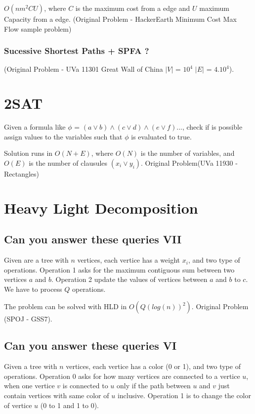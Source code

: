 \documentclass{report}
\begin{document}
            \bigskip
            
            $O(nm^2CU)$, where $C$ is the maximum cost from a edge and $U$ maximum Capacity from a edge. (Original Problem - HackerEarth Minimum Cost Max Flow sample problem)
    
            
            \subsubsection{Sucessive Shortest Paths + SPFA ?}
            
            (Original Problem - UVa 11301 Great Wall of China $|V|$ = $10^4$ $|E|$ = $4.10^4$).
            
            
    \section{2SAT}
    Given a formula like $\phi$ = $(a \lor b) \land (c \lor d) \land (e \lor f)...$, check if is possible assign values to the variables such that $\phi$ is evaluated to true.
    
    \bigskip
    
    Solution runs in $O(N + E)$, where $O(N)$ is the number of variables, and $O(E)$ is the number of clausules $(x_i \lor y_i)$. Original Problem(UVa 11930 - Rectangles)
    
    
    \section{Heavy Light Decomposition}
        \subsection{Can you answer these queries VII}
        Given are a tree with $n$ vertices, each vertice has a weight $x_i$, and two type of operations. Operation 1 asks for the maximum contiguous sum between two vertices $a$ and $b$. Operation 2 update the values of vertices between $a$ and $b$ to $c$. We have to process $Q$ operations.
        
        The problem can be solved with HLD in $O(Q(log(n))^2)$. Original Problem (SPOJ - GSS7).
        
        
        
        \subsection{Can you answer these queries VI}
        Given a tree with $n$ vertices, each vertice has a color (0 or 1), and two type of operations. Operation 0 asks for how many vertices are connected to a vertice $u$, when one vertice $v$ is connected to $u$ only if the path between $u$ and $v$ just contain vertices with same color of $u$ inclusive. Operation 1 is to change the color of vertice $u$ (0 to 1 and 1 to 0).
        
\end{document}
